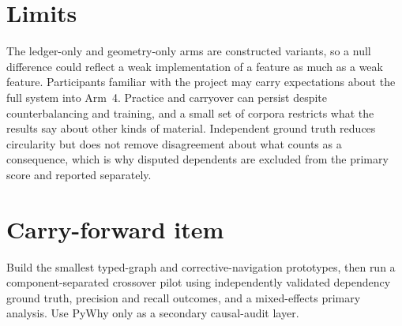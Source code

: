 \documentclass[11pt]{article}
\theoremstyle{definition}
\begin{document}
\section{Limits}

The ledger-only and geometry-only arms are constructed variants, so a null difference could reflect a weak implementation of a feature as much as a weak feature. Participants familiar with the project may carry expectations about the full system into Arm~4. Practice and carryover can persist despite counterbalancing and training, and a small set of corpora restricts what the results say about other kinds of material. Independent ground truth reduces circularity but does not remove disagreement about what counts as a consequence, which is why disputed dependents are excluded from the primary score and reported separately.

\section{Carry-forward item}

Build the smallest typed-graph and corrective-navigation prototypes, then run a component-separated crossover pilot using independently validated dependency ground truth, precision and recall outcomes, and a mixed-effects primary analysis. Use PyWhy only as a secondary causal-audit layer.
\end{document}
